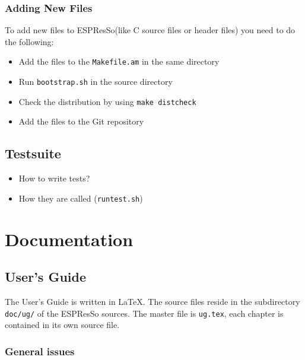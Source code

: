 \documentclass[
a4paper,                        %
11pt,                           %
twoside,                        %
footsepline,                    %
headsepline,                    %
headexclude,                    %
footexclude,                    %
pagesize,                       %
bibtotocnumbered,               %
idxtotoc                        %
]{scrreprt}
\newcommand{\es}{\mbox{\textsf{ESPResSo}}\xspace}
\begin{document}
\subsection{Adding New Files}

To add new files to \es (like C source files or header files)
you need to do the following:
\begin{itemize}
\item Add the files to the \texttt{Makefile.am} in the same directory
\item Run \texttt{bootstrap.sh} in the source directory
\item Check the distribution by using \verb!make distcheck!
\item Add the files to the Git repository
\end{itemize}

\section{Testsuite}
\label{sec:testsuite}

\begin{itemize}
\item How to write tests?
\item How they are called (\texttt{runtest.sh})
\end{itemize}

\chapter{Documentation}

\section{User's Guide}

The User's Guide is written in \LaTeX. The source files reside in the
subdirectory \texttt{doc/ug/} of the \es sources. The master file is
\texttt{ug.tex}, each chapter is contained in its own source file.

\subsection{General issues}
\end{document}
